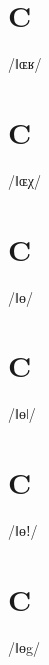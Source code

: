 \documentclass[10pt,a4paper,twoside]{book}
\begin{document}
\section*{C}

\begin{multicols}{3}
 {/ǁɶʁ/} {}
\end{multicols}

\section*{C}

\begin{multicols}{3}
 {/ǁɶχ/} {}
\end{multicols}

\section*{C}

\begin{multicols}{3}
 {/ǁɵ/} {}
\end{multicols}

\section*{C}

\begin{multicols}{3}
 {/ǁɵǀ/} {}
\end{multicols}

\section*{C}

\begin{multicols}{3}
 {/ǁɵǃ/} {}
\end{multicols}

\section*{C}

\begin{multicols}{3}
 {/ǁɵg/} {}
\end{multicols}
\end{document}
